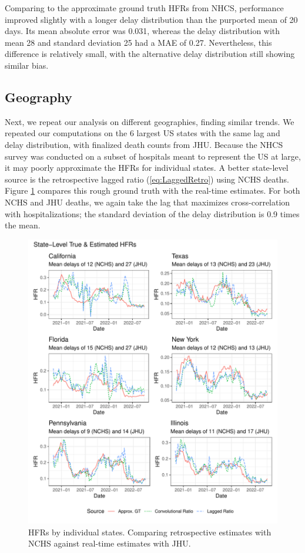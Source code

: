 \documentclass{article}
\begin{document}
Comparing to the approximate ground truth HFRs from NHCS, performance improved slightly with a longer delay distribution than the purported mean of 20 days. Its mean absolute error was 0.031, whereas the delay distribution with mean 28 and standard deviation 25 had a MAE of 0.27. Nevertheless, this difference is relatively small, with the alternative delay distribution still showing similar bias.

\subsection{Geography}

Next, we repeat our analysis on different geographies, finding similar trends. We repeated our computations on the 6 largest US states with the same lag and delay distribution, with finalized death counts from JHU. Because the NHCS survey was conducted on a subset of hospitals meant to represent the US at large, it may poorly approximate the HFRs for individual states. A better state-level source is the retrospective lagged ratio (\ref{eq:LaggedRetro}) using NCHS deaths. Figure \ref{fig:state-level} compares this rough ground truth with the real-time estimates. For both NCHS and JHU deaths, we again take the lag that maximizes cross-correlation with hospitalizations; the standard deviation of the delay distribution is 0.9 times the mean. 

 \begin{figure}
     \centering
     \includegraphics[width=0.8\linewidth]{Figures/Real/state_level_hfrs.pdf}
     \caption{HFRs by individual states. Comparing retrospective estimates with NCHS against real-time estimates with JHU.}
     \label{fig:state-level}
 \end{figure}
\end{document}
